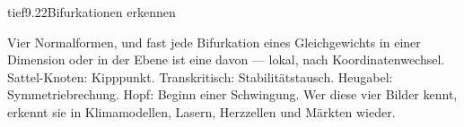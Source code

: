 \begin{loesungkarte}{tief}{9.22}{Bifurkationen erkennen}
\begin{mitnehmen}\kastentext
Vier Normalformen, und fast jede Bifurkation eines Gleichgewichts in einer Dimension oder in der Ebene ist eine davon --- lokal, nach Koordinatenwechsel. Sattel-Knoten: Kipppunkt. Transkritisch: Stabilitätstausch. Heugabel: Symmetriebrechung. Hopf: Beginn einer Schwingung. Wer diese vier Bilder kennt, erkennt sie in Klimamodellen, Lasern, Herzzellen und Märkten wieder.
\end{mitnehmen}
\end{loesungkarte}

